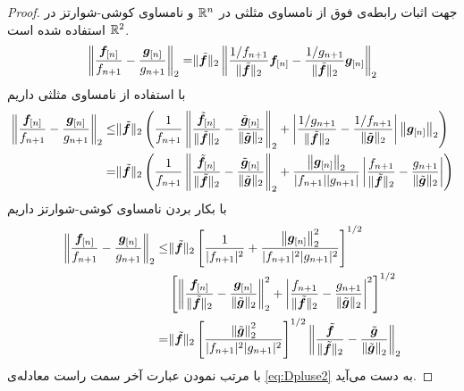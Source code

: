 \begin{proof}
جهت اثبات رابطه‌ی فوق از نامساوی مثلثی در
$\mathbb{R}^{n}$
و نامساوی کوشی-شوارتز در 
$\mathbb{R}^{2}$
استفاده شده است. 
\begin{align*}
\left\lVert\dfrac{\bm{f}_{[n]}}{f_{n+1}}-\dfrac{\bm{g}_{[n]}}{g_{n+1}}\right\rVert_{2} =& \|\tilde{\bm{f}}\|_{2} \left\lVert\dfrac{1/f_{n+1}}{\|\tilde{\bm{f}}\|_{2}}\bm{f}_{[n]} - \dfrac{1/g_{n+1}}{\|\tilde{\bm{f}}\|_{2}}\bm{g}_{[n]}  \right\rVert_{2} \\ 
\end{align*}
با استفاده از نامساوی مثلثی داریم
\begin{align*}
\left\lVert\dfrac{\bm{f}_{[n]}}{f_{n+1}}-\dfrac{\bm{g}_{[n]}}{g_{n+1}}\right\rVert_{2} \leq & \|\tilde{\bm{f}}\|_{2} \left( \dfrac{1}{f_{n+1}} \left\lVert\dfrac{\tilde{\bm{f}}_{[n]}}{\|\tilde{\bm{f}}\|_{2}} -\dfrac{\tilde{\bm{g}}_{[n]}}{\|\tilde{\bm{g}}\|_{2}} \right\rVert_{2} + \left| \dfrac{1/g_{n+1}}{\|\tilde{\bm{f}}\|_{2}}- \dfrac{1/f_{n+1}}{\|\tilde{\bm{g}}\|_{2}}\right| \left\lVert\bm{g}_{[n]}\right\rVert_{2} \right) \\
=& \|\tilde{\bm{f}}\|_{2} \left( \dfrac{1}{f_{n+1}} \left\lVert\dfrac{\tilde{\bm{f}}_{[n]}}{\|\tilde{\bm{f}}\|_{2}} -\dfrac{\tilde{\bm{g}}_{[n]}}{\|\tilde{\bm{g}}\|_{2}} \right\rVert_{2} + \dfrac{\left\lVert\bm{g}_{[n]}\right\rVert_{2}}{\vert f_{n+1} \vert \vert g_{n+1} \vert} 
\left| \dfrac{f_{n+1}}{\|\tilde{\bm{f}}\|_{2}}- \dfrac{g_{n+1}}{\|\tilde{\bm{g}}\|_{2}}\right| \right) \\
\end{align*}
با بکار بردن نامساوی کوشی-شوارتز داریم	
\begin{align*}
\left\lVert\dfrac{\bm{f}_{[n]}}{f_{n+1}}-\dfrac{\bm{g}_{[n]}}{g_{n+1}}\right\rVert_{2} \leq & \|\tilde{\bm{f}}\|_{2}  \left[ \dfrac{1}{\vert f_{n+1} \vert^{2}} + \dfrac{\left\lVert\bm{g}_{[n]}\right\rVert_{2}^{2} }{ \vert f_{n+1} \vert^{2} \vert g_{n+1} \vert^{2}} \right]^{1/2} \\ 
&\left[ \left\lVert\dfrac{\bm{f}_{[n]}}{\|\tilde{\bm{f}}\|_{2}} -\dfrac{\bm{g}_{[n]}}{\|\tilde{\bm{g}}\|_{2}} \right\rVert_{2}^{2} 
+ \left| \dfrac{f_{n+1}}{\|\tilde{\bm{f}}\|_{2}} -\dfrac{g_{n+1}}{\|\tilde{\bm{g}}\|_{2}} \right|^{2}
\right]^{1/2}\\
=& \|\tilde{\bm{f}}\|_{2} \left[ \dfrac{\left\lVert\tilde{\bm{g}}\right\rVert_{2}^{2} }{ \vert f_{n+1} \vert^{2} \vert g_{n+1} \vert^{2}} \right]^{1/2} \left\lVert\dfrac{\tilde{\bm{f}}}{\|\tilde{\bm{f}}\|_{2}} - \dfrac{\tilde{\bm{g}}}{\left\lVert\tilde{\bm{g}}\right\rVert_{2}}\right\rVert_{2}
\end{align*}
با مرتب نمودن عبارت آخر  سمت راست معادله‌ی
\eqref{eq:Dpluse2}
به دست می‌آید.
\end{proof}


